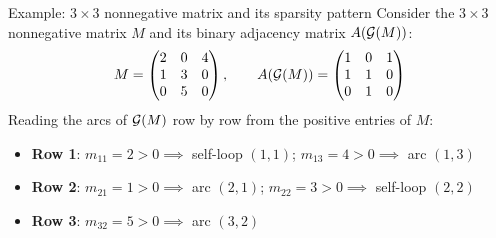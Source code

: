 \documentclass[aspectratio=169]{beamer}\usepackage[]{graphicx}\usepackage[]{xcolor}
\begin{document}
\begin{frame}{Example: $3 \times 3$ nonnegative matrix and its sparsity pattern}
Consider the $3 \times 3$ nonnegative matrix $M$ and its binary adjacency matrix $A(\mathcal{G}(M))$:
\[
M = \begin{pmatrix}
2 & 0 & 4 \\
1 & 3 & 0 \\
0 & 5 & 0
\end{pmatrix},
\qquad
A(\mathcal{G}(M)) = \begin{pmatrix}
1 & 0 & 1 \\
1 & 1 & 0 \\
0 & 1 & 0
\end{pmatrix}
\]
\vfill
Reading the arcs of $\mathcal{G}(M)$ row by row from the positive entries of $M$:
\begin{itemize}
\item \textbf{Row 1}: $m_{11} = 2 > 0 \implies$ self-loop $(1, 1)$; \quad $m_{13} = 4 > 0 \implies$ arc $(1, 3)$
\item \textbf{Row 2}: $m_{21} = 1 > 0 \implies$ arc $(2, 1)$; \quad $m_{22} = 3 > 0 \implies$ self-loop $(2, 2)$
\item \textbf{Row 3}: $m_{32} = 5 > 0 \implies$ arc $(3, 2)$
\end{itemize}
\end{frame}
\end{document}
